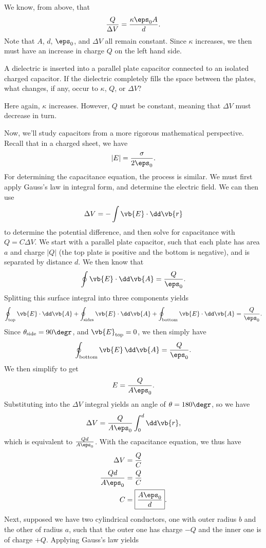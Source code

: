 \documentclass[11pt]{article}
\begin{document}
\begin{solution}
    We know, from above, that
    \[\frac{Q}{\Delta V} = \frac{\kappa\eps_0 A}{d}.\]
    Note that $A$, $d$, $\eps_0$, and $\Delta V$ all remain constant. Since $\kappa$ increases, we then must have an increase in charge $Q$ on the left hand side.
\end{solution}
\begin{example}
    A dielectric is inserted into a parallel plate capacitor connected to an isolated charged capacitor. If the dielectric completely fills the space between the plates, what changes, if any, occur to $\kappa$, $Q$, or $\Delta V$?
\end{example}
\begin{solution}
    Here again, $\kappa$ increases. However, $Q$ must be constant, meaning that $\Delta V$ must decrease in turn.
\end{solution}
Now, we'll study capacitors from a more rigorous mathematical perspective. Recall that in a charged sheet, we have
\[|E| = \frac{\sigma}{2\eps_0}.\]
For determining the capacitance equation, the process is similar. We must first apply Gauss's law in integral form, and determine the electric field. We can then use
\[\Delta V = -\int \vb{E} \cdot \dd\vb{r}\]
to determine the potential difference, and then solve for capacitance with $Q = C\Delta V$. We start with a parallel plate capacitor, such that each plate has area $a$ and charge $|Q|$ (the top plate is positive and the bottom is negative), and is separated by distance $d$. We then know that
\[\oint \vb{E}\cdot\dd\vb{A} = \frac{Q}{\eps_0}.\]
Splitting this surface integral into three components yields
\[\oint_{\text{top}} \vb{E}\cdot\dd\vb{A} + \oint_{\text{sides}} \vb{E}\cdot\dd\vb{A} + \oint_{\text{bottom}} \vb{E}\cdot\dd\vb{A}= \frac{Q}{\eps_0}.\]
Since $\theta_{\text{side}} = 90\degr$, and $\vb{E}_{\text{top}} = 0$, we then simply have
\[\oint_{\text{bottom}} \vb{E}\,\dd\vb{A} = \frac{Q}{\eps_0}.\]
We then simplify to get
\[E = \frac{Q}{A\eps_0}.\]
Substituting into the $\Delta V$ integral yields an angle of $\theta = 180\degr$, so we have
\[\Delta V = \frac{Q}{A\eps_0} \int_0^d \dd\vb{r},\]
which is equivalent to $\frac{Qd}{A\eps_0}$. With the capacitance equation, we thus have
\begin{align*}
    \Delta V &= \frac{Q}{C} \\
    \frac{Qd}{A\eps_0} &= \frac{Q}{C} \\
    C &= \boxed{\frac{A\eps_0}{d}}.
\end{align*}
Next, supposed we have two cylindrical conductors, one with outer radius $b$ and the other of radius $a$, such that the outer one has charge $-Q$ and the inner one is of charge $+Q$. Applying Gauss's law yields
\end{document}
